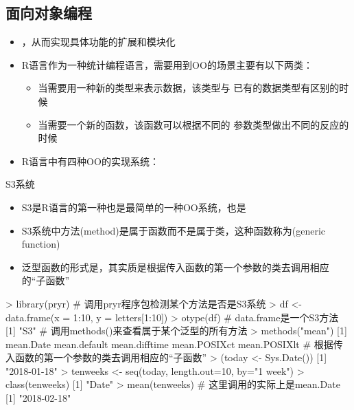 \subsection{面向对象编程}
\begin{frame}[t]{\subsecname}{}
\begin{itemize}
\item {}，从而实现具体功能的扩展和模块化
  \item R语言作为一种统计编程语言，需要用到OO的场景主要有以下两类：
  \begin{itemize}
     \item[\PencilLeftDown] 当需要用一种新的类型来表示数据，该类型与
   已有的数据类型有区别的时候
     \item[\PencilLeftDown] 当需要一个新的函数，该函数可以根据不同的
参数类型做出不同的反应的时候
  \end{itemize}
\item R语言中有四种OO的实现系统：
\end{itemize}  
\end{frame} 

\begin{frame}[t,fragile]{\subsecname}{S3系统}
  \begin{itemize}
  \item S3是R语言的第一种也是最简单的一种OO系统，也是
  \item S3系统中方法(method)是属于函数而不是属于类，这种函数称为(generic function)
  \item 泛型函数的形式是，其实质是根据传入函数的第一个参数的类去调用相应的“子函数”
  \end{itemize}  

\begin{rcode}
> library(pryr) # 调用pryr程序包检测某个方法是否是S3系统
> df <- data.frame(x = 1:10, y = letters[1:10])
> otype(df)    # data.frame是一个S3方法
[1] "S3"
# 调用methods()来查看属于某个泛型的所有方法
> methods("mean")
[1] mean.Date   mean.default    mean.difftime   mean.POSIXct    mean.POSIXlt
# 根据传入函数的第一个参数的类去调用相应的“子函数”
> (today <- Sys.Date())
[1] "2018-01-18"
> tenweeks <- seq(today, length.out=10, by="1 week")
> class(tenweeks)
[1] "Date"
> mean(tenweeks) # 这里调用的实际上是mean.Date
[1] "2018-02-18" 
\end{rcode}  
\end{frame}

